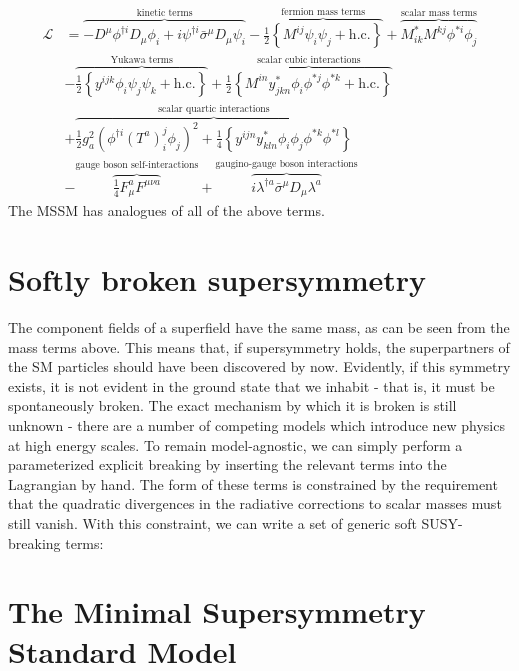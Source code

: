 \begin{align*}
  \mathcal{L} &= \overbrace{-D^\mu\phi^{\dagger i}D_\mu\phi_i + i\psi^{\dagger i}\bar{\sigma}^\mu D_\mu\psi_i}^\text{kinetic terms}
  -\overbrace{\frac{1}{2}\left\{M^{ij}\psi_i\psi_j+\text{h.c.}\right\}}^{\text{fermion mass terms}}
   +\overbrace{M_{ik}^*M^{kj}\phi^{*i}\phi_j}^\text{scalar mass terms}\\
  &-\overbrace{\frac{1}{2}\left\{y^{ijk}\phi_i\psi_j\psi_k+\text{h.c.}\right\}}^{\text{Yukawa terms}}
  +\overbrace{\frac{1}{2}\left\{M^{in}y_{jkn}^*\phi_i\phi^{*j}\phi^{*k}+\text{h.c.}\right\}}^\text{scalar cubic interactions}\\
  &+\overbrace{\frac{1}{2}g_a^2(\phi^{\dagger i}(T^a)_i^j\phi_j)^2+\frac{1}{4}\left\{y^{ijn}y_{kln}^*\phi_i\phi_j\phi^{*k}\phi^{*l}\right\}}^\text{scalar quartic interactions}\\
  &-\overbrace{\frac{1}{4}F_{\mu}^aF^{\mu\nu a}}^\text{gauge boson self-interactions}
  +\overbrace{i\lambda^{\dagger a}\bar{\sigma}^\mu D_\mu\lambda^a}^\text{gaugino-gauge boson interactions}
\end{align*}
The MSSM has analogues of all of the above terms.

\section{Softly broken supersymmetry}
The component fields of a superfield have the same mass, as can be seen from the mass terms above. This means that, if supersymmetry holds, the superpartners of the SM particles should have been discovered by now. Evidently, if this symmetry exists, it is not evident in the ground state that we inhabit - that is, it must be spontaneously broken. The exact mechanism by which it is broken is still unknown - there are a number of competing models which introduce new physics at high energy scales. To remain model-agnostic, we can simply perform a parameterized explicit breaking by inserting the relevant terms into the Lagrangian by hand. The form of these terms is constrained by the requirement that the quadratic divergences in the radiative corrections to scalar masses must still vanish. With this constraint, we can write a set of generic soft SUSY-breaking terms:

\section{The Minimal Supersymmetry Standard Model}

